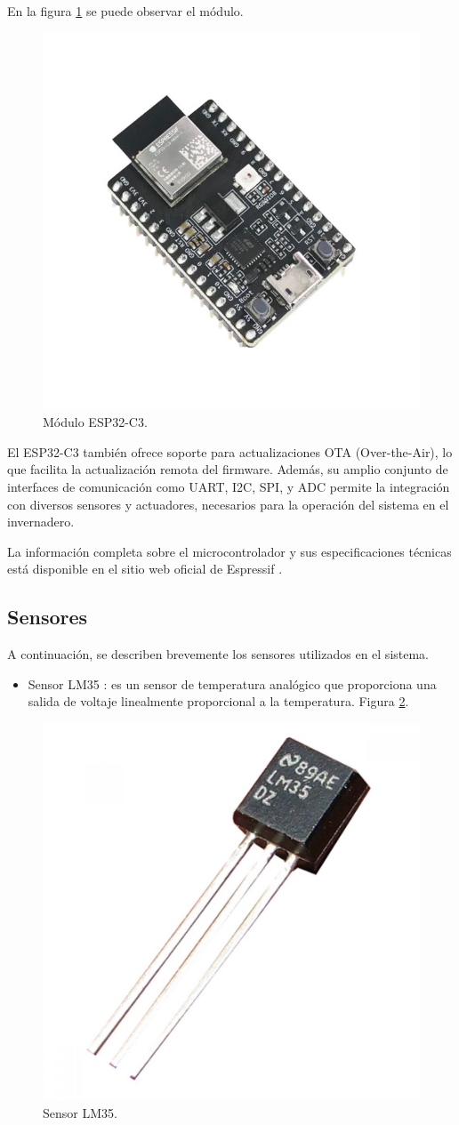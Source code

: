 En la figura \ref{fig:esp32c3} se puede observar el módulo.

\begin{figure}[htpb]
    \centering
    \includegraphics[width=.3\textwidth]{./Figures/esp32c3.png}
    \caption{Módulo ESP32-C3.}
    \label{fig:esp32c3}
\end{figure}

El ESP32-C3 también ofrece soporte para actualizaciones OTA (Over-the-Air), lo que facilita la actualización remota del firmware. Además, su amplio conjunto de interfaces de comunicación como UART, I2C, SPI, y ADC permite la integración con diversos sensores y actuadores, necesarios para la operación del sistema en el invernadero. 

La información completa sobre el microcontrolador y sus especificaciones técnicas está disponible en el sitio web oficial de Espressif \citep{docsesp32c3}.

\subsection{Sensores}

A continuación, se describen brevemente los sensores utilizados en el sistema.

\begin{itemize}
    \item Sensor LM35 \citep{sensor_lm35}: es un sensor de temperatura analógico que proporciona una salida de voltaje linealmente proporcional a la temperatura. Figura \ref{fig:lm35}.
\end{itemize}

\begin{figure}[H]
	\centering
	\includegraphics[width=.2\textwidth]{./Figures/sensor_lm35.png}
	\caption{Sensor LM35.}
	\label{fig:lm35}
\end{figure}

